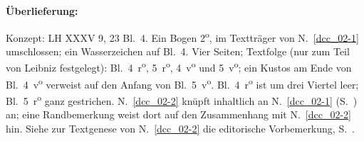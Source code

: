 %
%
%
%
%
\frenchspacing%
%
\begin{ledgroupsized}[r]{120mm}%
\footnotesize%
\pstart%
\noindent\textbf{Überlieferung:}%
\pend%
\end{ledgroupsized}%
\begin{ledgroupsized}[r]{114mm}%
\footnotesize%
\pstart%
\parindent -6mm
%
Konzept: LH XXXV 9, 23 Bl.~4.
Ein Bogen 2\textsuperscript{o},
im Textträger von N.~\ref{dcc_02-1} %
umschlossen;
ein Wasserzeichen auf Bl.~4.
Vier Seiten;
Textfolge (nur zum Teil von Leibniz festgelegt): Bl.~4~r\textsuperscript{o}, 5~r\textsuperscript{o}, 4~v\textsuperscript{o}\! und 5~v\textsuperscript{o}; 
ein Kustos am Ende von Bl.~4~v\textsuperscript{o} verweist auf den Anfang von Bl.~5~v\textsuperscript{o}.
Bl.~4~r\textsuperscript{o} ist um drei Viertel leer;
Bl.~5~r\textsuperscript{o} ganz gestrichen.
N.~\ref{dcc_02-2} %
knüpft inhaltlich an N.~\ref{dcc_02-1} %
(S.~\pageref{LH_35_09_23_006r_MargDeIIoIIa}) an;
eine Randbemerkung weist dort auf den Zusammenhang mit N.~\ref{dcc_02-2} %
hin.
Siehe zur Textgenese von N.~\ref{dcc_02-2} die editorische Vorbemerkung, S.~.
\pend%
\end{ledgroupsized}%
